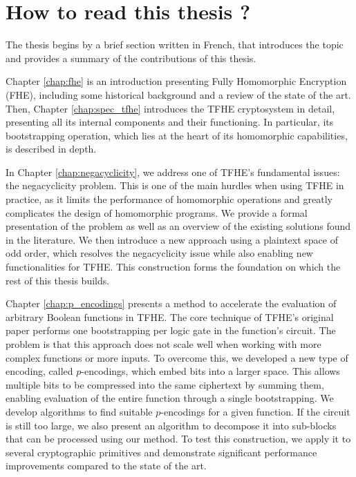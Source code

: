 
\chapter*{How to read this thesis ?}

The thesis begins by a brief section written in French, that introduces the topic and provides a summary of the contributions of this thesis.

Chapter \ref{chap:fhe} is an introduction presenting Fully Homomorphic Encryption (FHE), including some historical background and a review of the state of the art. Then, Chapter \ref{chap:spec_tfhe} introduces the TFHE cryptosystem in detail, presenting all its internal components and their functioning. In particular, its bootstrapping operation, which lies at the heart of its homomorphic capabilities, is described in depth.

In Chapter \ref{chap:negacyclicity}, we address one of TFHE’s fundamental issues: the negacyclicity problem. This is one of the main hurdles when using TFHE in practice, as it limits the performance of homomorphic operations and greatly complicates the design of homomorphic programs. We provide a formal presentation of the problem as well as an overview of the existing solutions found in the literature. We then introduce a new approach using a plaintext space of odd order, which resolves the negacyclicity issue while also enabling new functionalities for TFHE. This construction forms the foundation on which the rest of this thesis builds.

Chapter \ref{chap:p_encodings} presents a method to accelerate the evaluation of arbitrary Boolean functions in TFHE. The core technique of TFHE’s original paper performs one bootstrapping per logic gate in the function’s circuit. The problem is that this approach does not scale well when working with more complex functions or more inputs. To overcome this, we developed a new type of encoding, called $p$-encodings, which embed bits into a larger space. This allows multiple bits to be compressed into the same ciphertext by summing them, enabling evaluation of the entire function through a single bootstrapping. We develop algorithms to find suitable $p$-encodings for a given function. If the circuit is still too large, we also present an algorithm to decompose it into sub-blocks that can be processed using our method. To test this construction, we apply it to several cryptographic primitives and demonstrate significant performance improvements compared to the state of the art.

